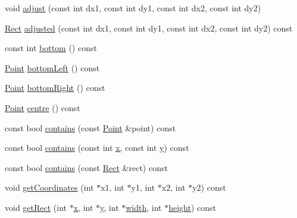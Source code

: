\begin{DoxyCompactItemize}
\item 
void \hyperlink{classprism_1_1geometry_1_1_rect_a1083c95584849792cba377c873e64b4e}{adjust} (const int dx1, const int dy1, const int dx2, const int dy2)
\item 
\hyperlink{classprism_1_1geometry_1_1_rect}{Rect} \hyperlink{classprism_1_1geometry_1_1_rect_ac79b187d7ae4b8530755b62902f1a9e3}{adjusted} (const int dx1, const int dy1, const int dx2, const int dy2) const 
\item 
const int \hyperlink{classprism_1_1geometry_1_1_rect_aadf2911d76976a6f773acc9a0c6f6b82}{bottom} () const 
\item 
\hyperlink{classprism_1_1geometry_1_1_point}{Point} \hyperlink{classprism_1_1geometry_1_1_rect_a0dfdb07cd5b41a228f9a0857d89d3053}{bottom\+Left} () const 
\item 
\hyperlink{classprism_1_1geometry_1_1_point}{Point} \hyperlink{classprism_1_1geometry_1_1_rect_a16a9088be2bfd87437286a23aed2094c}{bottom\+Right} () const 
\item 
\hyperlink{classprism_1_1geometry_1_1_point}{Point} \hyperlink{classprism_1_1geometry_1_1_rect_a54b2322f49843c991054006fabe2f693}{centre} () const 
\item 
const bool \hyperlink{classprism_1_1geometry_1_1_rect_a914016ca0b12a9aa21e77527746454cc}{contains} (const \hyperlink{classprism_1_1geometry_1_1_point}{Point} \&point) const 
\item 
const bool \hyperlink{classprism_1_1geometry_1_1_rect_a06118ba60a892201ab16fbfefefb60ee}{contains} (const int \hyperlink{classprism_1_1geometry_1_1_rect_a7ecf0e30c1485b8b6ed1c83625e0ce4c}{x}, const int \hyperlink{classprism_1_1geometry_1_1_rect_aae87aa965538d7d9ba24050d111fbd0f}{y}) const 
\item 
const bool \hyperlink{classprism_1_1geometry_1_1_rect_a1fce0ff592c8bc5c0f9e69eeb0278f2b}{contains} (const \hyperlink{classprism_1_1geometry_1_1_rect}{Rect} \&rect) const 
\item 
void \hyperlink{classprism_1_1geometry_1_1_rect_a4c039f77c79ddf46ee0e1141368cd835}{get\+Coordinates} (int $\ast$x1, int $\ast$y1, int $\ast$x2, int $\ast$y2) const 
\item 
void \hyperlink{classprism_1_1geometry_1_1_rect_a85e1ea516a78da51ba82ce845c2c45bd}{get\+Rect} (int $\ast$\hyperlink{classprism_1_1geometry_1_1_rect_a7ecf0e30c1485b8b6ed1c83625e0ce4c}{x}, int $\ast$\hyperlink{classprism_1_1geometry_1_1_rect_aae87aa965538d7d9ba24050d111fbd0f}{y}, int $\ast$\hyperlink{classprism_1_1geometry_1_1_rect_afe228be73477fba4bb5865c23d2761f2}{width}, int $\ast$\hyperlink{classprism_1_1geometry_1_1_rect_afe44f3f138f24808dba2bd807dbbe832}{height}) const 

\end{DoxyCompactItemize}

